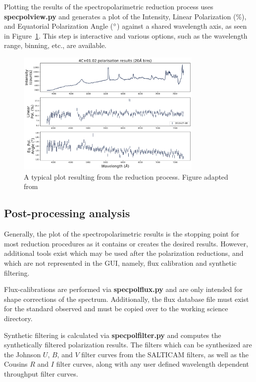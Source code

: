 Plotting the results of the spectropolarimetric reduction process uses \textbf{specpolview.py} and generates a plot of the Intensity, Linear Polarization ($\%$), and Equatorial Polarization Angle ($\hbox{$^\circ$}$) against a shared wavelength axis, as seen in Figure~\ref{fig:polsalt_plot}. This step is interactive and various options, such as the wavelength range, binning, etc., are available.

\begin{figure}[t]
    \centering
    \includegraphics[width = 0.8\textwidth]{figures/2_polsalt_plot.pdf}
    \caption{A typical plot resulting from the reduction process. Figure adapted from \citep{cooper_HEASA2022}}
    \label{fig:polsalt_plot}
\end{figure}

\subsection{Post-processing analysis}

Generally, the plot of the spectropolarimetric results is the stopping point for most reduction procedures as it contains or creates the desired results. However, additional tools exist which may be used after the polarization reductions, and which are not represented in the \gls{GUI}, namely, flux calibration and synthetic filtering.

Flux-calibrations are performed via \textbf{specpolflux.py} and are only intended for shape corrections of the spectrum. Additionally, the flux database file must exist for the standard observed and must be copied over to the working science directory.

Synthetic filtering is calculated via \textbf{specpolfilter.py} and computes the synthetically filtered polarization results. The filters which can be synthesized are the Johnson $U$, $B$, and $V$ filter curves from the \gls{SALTICAM} filters, as well as the Cousins $R$ and $I$ filter curves, along with any user defined wavelength dependent throughput filter curves.

